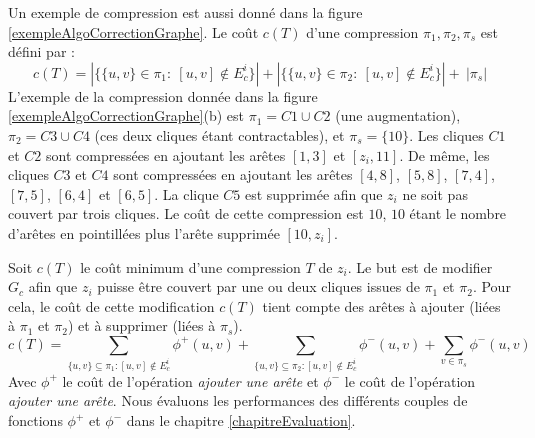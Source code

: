 Un exemple de compression est aussi donn\'e dans la figure \ref{exempleAlgoCorrectionGraphe}.
Le co\^ut $c(T)$ d'une compression $\pi_{1},\pi_{2},\pi_{s}$ est d\'efini par : 
$$c(T) = | \{\{u,v\} \in \pi_{1}:~[u,v]\not\in E_{c}^{i}\}| + |\{\{u,v\} \in \pi_2:~[u,v]\not\in E_{c}^{i}\}| +~ |\pi_s| $$
L'exemple de la compression donn\'ee dans la figure \ref{exempleAlgoCorrectionGraphe}(b) est $\pi_1 = C1 \cup C2$ (une augmentation), $\pi_2 = C3 \cup C4$ (ces deux cliques \'etant contractables), et $\pi_s = \{10\}$.
Les cliques $C1$ et $C2$ sont compress\'ees en ajoutant les ar\^etes $[1,3]$ et $[z_i,11]$. De m\^eme, les cliques $C3$ et $C4$ sont compress\'ees en ajoutant les ar\^etes  $[4,8]$, $[5,8]$, $[7,4]$, $[7,5]$, $[6,4]$ et $[6,5]$. La clique $C5$ est supprim\'ee afin que $z_i$ ne soit pas couvert par trois cliques.
Le co\^ut  de cette compression est $10$, $10$ \'etant le nombre d'ar\^etes en pointill\'ees plus l'ar\^ete supprim\'ee $[10,z_i]$.
\newline

Soit  $c(T)$ le co\^ut minimum d'une compression $T$ de $z_i$.
Le but est de modifier $G_c$ afin que $z_i$ puisse \^etre couvert par une ou deux cliques issues de $\pi_1$ et $\pi_2$.
Pour cela, le co\^ut de cette modification $c(T)$ tient compte des ar\^etes \`a ajouter (li\'ees \`a $\pi_1$ et $\pi_2$) et \`a supprimer (li\'ees \`a $\pi_s$).
\begin{equation}
c(T) = \sum_{ \{u,v\} \subseteq \pi_1: [u,v] \notin E_c^i } \phi^{+}(u,v) + \sum_{ \{u,v\} \subseteq \pi_2: [u,v] \notin E_c^i } \phi^{-}(u,v) + \sum_{ v \in \pi_s } \phi^{-}(u,v)
\end{equation}
Avec $\phi^{+}$ le co\^ut de l'op\'eration {\em ajouter une ar\^ete} et  
$\phi^{-}$ le co\^ut de l'op\'eration {\em ajouter une ar\^ete}.
\newline
Nous \'evaluons les performances des diff\'erents couples de fonctions $\phi^{+}$ et $\phi^{-}$ dans le chapitre \ref{chapitreEvaluation}.
\newline


